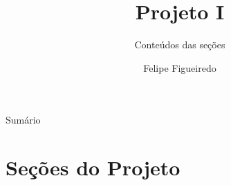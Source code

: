 \documentclass{beamer}
\title%
{Projeto I}
\subtitle
{Conteúdos das seções} %
\author%
{Felipe Figueiredo}%
\institute[INTO] %
{Instituto Nacional de Traumatologia e Ortopedia
}
\date%
{}
\begin{document}
\begin{frame}
  \titlepage
\end{frame}

\begin{frame}{Sumário}
  \tableofcontents
\end{frame}








\section{Seções do Projeto}
\end{document}
